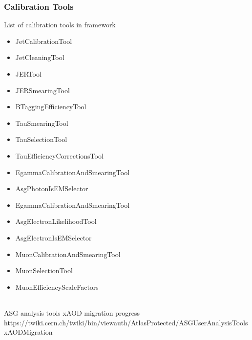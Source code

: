\documentclass{beamer}
\begin{document}
\begin{frame}
\frametitle{Calibration Tools}
List of calibration tools in framework\\
\vspace{3mm}
\begin{minipage}{0.48\textwidth}
\begin{itemize}
 \item JetCalibrationTool
 \item JetCleaningTool
 \item JERTool
 \item JERSmearingTool
 \item BTaggingEfficiencyTool
\end{itemize}
\begin{itemize}
 \item TauSmearingTool
 \item TauSelectionTool
 \item TauEfficiencyCorrectionsTool
\end{itemize}
\begin{itemize}
 \item EgammaCalibrationAndSmearingTool
 \item AsgPhotonIsEMSelector
\end{itemize}
\end{minipage}
\begin{minipage}{0.48\textwidth}
\begin{itemize}
 \item EgammaCalibrationAndSmearingTool
 \item AsgElectronLikelihoodTool
 \item AsgElectronIsEMSelector
\end{itemize}
\begin{itemize}
 \item MuonCalibrationAndSmearingTool
 \item MuonSelectionTool
 \item MuonEfficiencyScaleFactors
\end{itemize}
\end{minipage}\\
\vspace{3mm}
ASG analysis tools xAOD migration progress\\
https://twiki.cern.ch/twiki/bin/viewauth/AtlasProtected/ASGUserAnalysisToolsxAODMigration
\end{frame}
\end{document}
